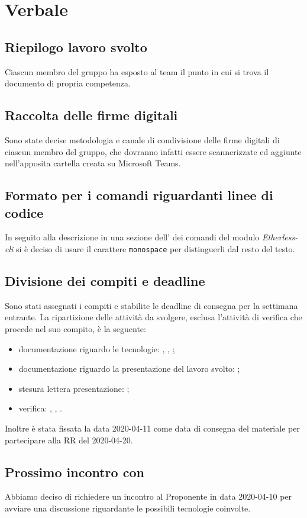 \section{Verbale}
	
	\subsection{Riepilogo lavoro svolto}
		Ciascun membro del gruppo ha esposto al team il punto in cui si trova il documento di propria competenza.

	\subsection{Raccolta delle firme digitali}
		Sono state decise metodologia e canale di condivisione delle firme digitali di ciascun membro del gruppo, che dovranno infatti essere scannerizzate ed aggiunte nell'apposita cartella creata su Microsoft Teams.
		
	\subsection{Formato per i comandi riguardanti linee di codice}
		In seguito alla descrizione in una sezione dell'\AdR{} dei comandi del modulo \textit{Etherless-cli} si è deciso di usare il carattere \texttt{monospace} per distinguerli dal resto del testo.
				
	\subsection{Divisione dei compiti e deadline}
		Sono stati assegnati i compiti e stabilite le deadline di consegna per la settimana entrante. La ripartizione delle attività da svolgere, esclusa l'attività di verifica che procede nel suo compito, è la seguente:
		\begin{itemize}
			\item{documentazione riguardo le tecnologie: \AS, \EG, \FJ;}
			\item{documentazione riguardo la presentazione del lavoro svolto: \NF;}
			\item{stesura lettera presentazione: \VB;}
			\item{verifica: \AZ, \LB, \MP.}
		\end{itemize}
		Inoltre è stata fissata la data 2020-04-11 come data di consegna del materiale per partecipare alla RR del 2020-04-20.

	\subsection{Prossimo incontro con \Proponente{}}
	    Abbiamo deciso di richiedere un incontro al Proponente in data 2020-04-10 per avviare una discussione riguardante le possibili tecnologie coinvolte. 

